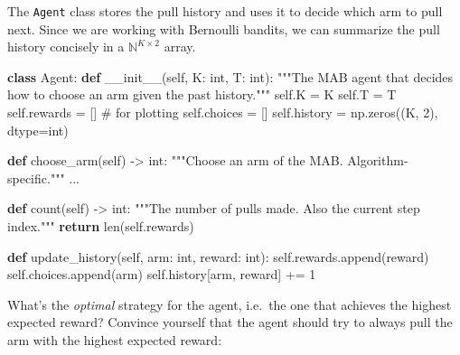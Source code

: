 \documentclass[
  letterpaper,
  DIV=11,
  numbers=noendperiod]{scrreprt}
\newenvironment{Shaded}{\begin{snugshade}}{\end{snugshade}}
\newcommand{\BuiltInTok}[1]{\textcolor[rgb]{0.00,0.23,0.31}{#1}}
\newcommand{\CommentTok}[1]{\textcolor[rgb]{0.37,0.37,0.37}{#1}}
\newcommand{\ControlFlowTok}[1]{\textcolor[rgb]{0.00,0.23,0.31}{\textbf{#1}}}
\newcommand{\DecValTok}[1]{\textcolor[rgb]{0.68,0.00,0.00}{#1}}
\newcommand{\FunctionTok}[1]{\textcolor[rgb]{0.28,0.35,0.67}{#1}}
\newcommand{\KeywordTok}[1]{\textcolor[rgb]{0.00,0.23,0.31}{\textbf{#1}}}
\newcommand{\NormalTok}[1]{\textcolor[rgb]{0.00,0.23,0.31}{#1}}
\newcommand{\OperatorTok}[1]{\textcolor[rgb]{0.37,0.37,0.37}{#1}}
\newcommand{\VariableTok}[1]{\textcolor[rgb]{0.07,0.07,0.07}{#1}}
\theoremstyle{plain}
\theoremstyle{plain}
\theoremstyle{definition}
\theoremstyle{definition}
\theoremstyle{remark}
\begin{document}
The \texttt{Agent} class stores the pull history and uses it to decide
which arm to pull next. Since we are working with Bernoulli bandits, we
can summarize the pull history concisely in a
\(\mathbb{N}^{K \times 2}\) array.

\begin{Shaded}
\begin{Highlighting}[]
\KeywordTok{class}\NormalTok{ Agent:}
    \KeywordTok{def} \FunctionTok{\_\_init\_\_}\NormalTok{(}\VariableTok{self}\NormalTok{, K: }\BuiltInTok{int}\NormalTok{, T: }\BuiltInTok{int}\NormalTok{):}
        \CommentTok{"""The MAB agent that decides how to choose an arm given the past history."""}
        \VariableTok{self}\NormalTok{.K }\OperatorTok{=}\NormalTok{ K}
        \VariableTok{self}\NormalTok{.T }\OperatorTok{=}\NormalTok{ T}
        \VariableTok{self}\NormalTok{.rewards }\OperatorTok{=}\NormalTok{ []  }\CommentTok{\# for plotting}
        \VariableTok{self}\NormalTok{.choices }\OperatorTok{=}\NormalTok{ []}
        \VariableTok{self}\NormalTok{.history }\OperatorTok{=}\NormalTok{ np.zeros((K, }\DecValTok{2}\NormalTok{), dtype}\OperatorTok{=}\BuiltInTok{int}\NormalTok{)}

    \KeywordTok{def}\NormalTok{ choose\_arm(}\VariableTok{self}\NormalTok{) }\OperatorTok{{-}\textgreater{}} \BuiltInTok{int}\NormalTok{:}
        \CommentTok{"""Choose an arm of the MAB. Algorithm{-}specific."""}
\NormalTok{        ...}

    \KeywordTok{def}\NormalTok{ count(}\VariableTok{self}\NormalTok{) }\OperatorTok{{-}\textgreater{}} \BuiltInTok{int}\NormalTok{:}
        \CommentTok{"""The number of pulls made. Also the current step index."""}
        \ControlFlowTok{return} \BuiltInTok{len}\NormalTok{(}\VariableTok{self}\NormalTok{.rewards)}

    \KeywordTok{def}\NormalTok{ update\_history(}\VariableTok{self}\NormalTok{, arm: }\BuiltInTok{int}\NormalTok{, reward: }\BuiltInTok{int}\NormalTok{):}
        \VariableTok{self}\NormalTok{.rewards.append(reward)}
        \VariableTok{self}\NormalTok{.choices.append(arm)}
        \VariableTok{self}\NormalTok{.history[arm, reward] }\OperatorTok{+=} \DecValTok{1}
\end{Highlighting}
\end{Shaded}

What's the \emph{optimal} strategy for the agent, i.e.~the one that
achieves the highest expected reward? Convince yourself that the agent
should try to always pull the arm with the highest expected reward:
\end{document}
